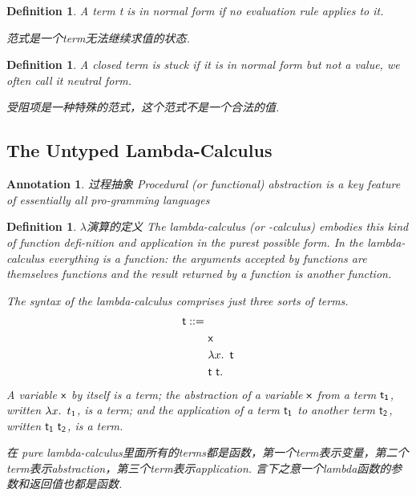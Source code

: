 \documentclass{article}
\theoremstyle{plain}
\newtheorem{definition}[theorem]{Definition}
\newtheorem{annotation}[theorem]{Annotation}
\theoremstyle{nonumberplain}
\newcommand{\lam}[2]{\ensuremath{\lambda #1\ldotp~ #2}} %
\newcommand{\bnfdef}[0]{\ensuremath{\mathrel{::=}}} %
\newcommand{\term}[1]{\ensuremath\mathsf{#1}}
\begin{document}
\begin{definition}
\rm A term t is in normal form if no evaluation rule applies to it.

{\color{blue} 范式是一个term无法继续求值的状态}.
\end{definition}

\begin{definition}
\rm A closed term is stuck if it is in normal form but not a value, we often call it neutral form.

{\color{blue} 受阻项是一种特殊的范式，这个范式不是一个合法的值}.
\end{definition}



\newpage
\subsection{The Untyped Lambda-Calculus}

\begin{annotation}
\rm {\color{red} 过程抽象} Procedural (or functional) abstraction is a key feature of essentially all pro-gramming languages
\end{annotation}

\begin{definition}
\rm {\color{red} $\lambda$演算的定义} The lambda-calculus (or -calculus) embodies this kind of function defi-nition and application in the purest possible form. In the lambda-calculus everything is a function: the arguments accepted by functions are themselves functions and the result returned by a function is another function.

The syntax of the lambda-calculus comprises just three sorts of terms.
$$
\begin{aligned}
\term{t} \bnfdef & \\
&\ \term{x} \\
&\ \lam{x}{\term{t}} \\
&\ \term{t}\ \term{t}.
\end{aligned}
$$
A variable $\term{x}$ by itself is a term; the abstraction of a variable $\term{x}$ from a term $\term{t_1}$, written $\lam{x}{t_1}$, is a term; and the application of a term $\term{t_1}$ to another term $\term{t_2}$, written $\term{t_1}\ \term{t_2}$, is a term.

{\color{blue} 在 pure lambda-calculus里面所有的terms都是函数，第一个term表示变量，第二个term表示abstraction，第三个term表示application. 言下之意一个lambda函数的参数和返回值也都是函数}. 
\end{definition}
\end{document}
